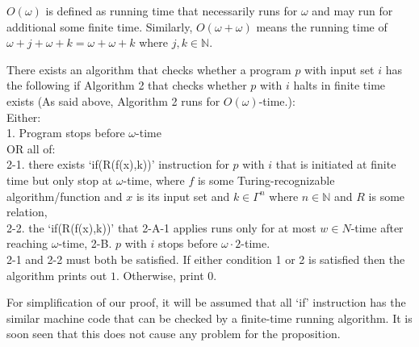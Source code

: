 \documentclass{roffin}
\begin{document}
\begin{definition}
$O(\omega)$ is defined as running time that necessarily runs for $\omega$ and may run for additional some finite time. Similarly, $O(\omega + \omega)$ means the running time of $\omega+j+\omega+k = \omega+\omega+k$ where $j,k \in \mathbb{N}$. 
\end{definition}
\begin{proposition}
There exists an algorithm that checks whether a program $p$ with input set $i$ has the following if Algorithm 2 that checks whether $p$ with $i$ halts in finite time exists (As said above, Algorithm 2 runs for $O(\omega)$-time.):\\
Either:\\
1. Program stops before $\omega$-time\\
OR all of:\\
2-1. there exists `if(R(f(x),k))' instruction for $p$ with $i$ that is initiated at finite time but only stop at $\omega$-time, where $f$ is some Turing-recognizable algorithm/function and $x$ is its input set and $k \in \Gamma^n$ where $n \in \mathbb{N}$ and $R$ is some relation,\\
2-2. the `if(R(f(x),k))' that 2-A-1 applies runs only for at most $w \in N$-time after reaching $\omega$-time, 
2-B. $p$ with $i$ stops before $\omega \cdot 2$-time.\\
2-1 and 2-2 must both be satisfied. If either condition 1 or 2 is satisfied then the algorithm prints out $1$. Otherwise, print $0$.     
\end{proposition}
For simplification of our proof, it will be assumed that all `if' instruction has the similar machine code that can be checked by a finite-time running algorithm. It is soon seen that this does not cause any problem for the proposition.
\end{document}
